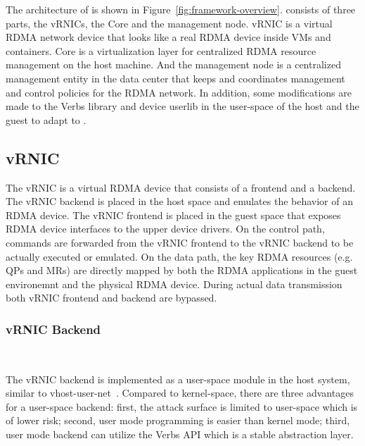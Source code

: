 The architecture of \sys is shown in Figure~\ref{fig:framework-overview}.
\sys consists of three parts, the vRNICs, the \sys Core and the management node. vRNIC is a virtual RDMA network device that looks like a real RDMA device inside VMs and containers. \sys Core is a virtualization layer for centralized RDMA resource management on the host machine. And the management node is a centralized management entity in the data center that keeps and coordinates management and control policies for the RDMA network.
In addition, some modifications are made to the Verbs library and device userlib in the user-space of the host and the guest to adapt to \sys.

\subsection{vRNIC}

The vRNIC is a virtual RDMA device that consists of a frontend and a backend. The vRNIC backend is placed in the host space and emulates the behavior of an RDMA device. The vRNIC frontend is placed in the guest space that exposes RDMA device interfaces to the upper device drivers.
On the control path, commands are forwarded from the vRNIC frontend to the vRNIC backend to be actually executed or emulated.
On the data path, the key RDMA resources (e.g. QPs and MRs) are directly mapped by both the RDMA applications in the guest environemnt and the physical RDMA device. During actual data transmission both vRNIC frontend and backend are bypassed.

\subsubsection{\textbf{vRNIC Backend}}
\
\noindent

The vRNIC backend is implemented as a user-space module in the host system, similar to vhost-user-net~\cite{vhost-user-net}. Compared to kernel-space, there are three advantages for a user-space backend: first, the attack surface is limited to user-space which is of lower risk; second, user mode programming is easier than kernel mode; third, user mode backend can utilize the Verbs API which is a stable abstraction layer.


